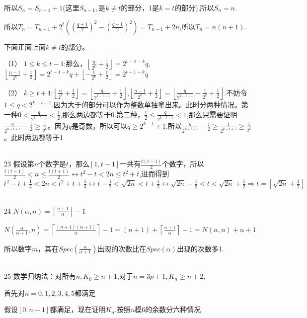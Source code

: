 \documentclass[onecolumn]{article}
\begin{document}
所以$S_{n}=S_{n-1}+1$(这里$S_{n-1},$是$k \ne t$的部分，1是$k=t$的部分),所以$S_{n}=n$. \par
所以$T_{n}=T_{n-1}+2^{t}((\frac{q+1}{2})^{2}-(\frac{q-1}{2})^{2})=T_{n-1}+2n$,所以$T_{n}=n(n+1)$. \par
下面正面上面$k\ne t$的部分。\par
（1） $1 \le k \le t-1$:那么，$\left \lfloor \frac{n}{2^{k}}+\frac{1}{2} \right \rfloor=2^{t-1-k}q$,$\left \lfloor \frac{n-1}{2^{k}}+\frac{1}{2} \right \rfloor=2^{t-1-k}q+\left \lfloor -\frac{1}{2^{k}}+\frac{1}{2} \right \rfloor=2^{t-1-k}q$\par
（2） $k \ge t+1$:$\left \lfloor \frac{n}{2^{k}}+\frac{1}{2} \right \rfloor=\left \lfloor \frac{q}{2^{k-t+1}}+\frac{1}{2} \right \rfloor$,$\left \lfloor \frac{n-1}{2^{k}}+\frac{1}{2} \right \rfloor=\left \lfloor \frac{q}{2^{k-t+1}}-\frac{1}{2^{k}}+\frac{1}{2} \right \rfloor$.不妨令$1\le q<2^{k-t+1}$.因为大于的部分可以作为整数单独拿出来。此时分两种情况。第一种$0 < \frac{q}{2^{k-t+1}} < \frac{1}{2}$,那么两边都等于0.第二种，$\frac{1}{2} \le \frac{q}{2^{k-t+1}} < 1$,那么只需要证明$ \frac{q}{2^{k-t+1}}-\frac{1}{2} \ge \frac{1}{2^{k}}$。因为$q$是奇数，所以可以$q \ge 2^{k-t}+1$.所以$\frac{q}{2^{k-t+1}}-\frac{1}{2} \ge \frac{1}{2^{k-t+1}} \ge \frac{1}{2^{k}} $。此时两边都等于1\par
~\\
23 假设第$n$个数字是$t$，那么$[1,t-1]$一共有$\frac{t(t-1)}{2}$个数字，所以$\frac{t(t-1)}{2}<n\leq \frac{t(t+1)}{2}\leftrightarrow t^{2}-t<2n\leq t^{2}+t$,进而得到$ t^{2}-t+\frac{1}{4}<2n< t^{2}+t+\frac{1}{4}\leftrightarrow t-\frac{1}{2}<\sqrt{2n}<t+\frac{1}{2}\leftrightarrow \sqrt{2n}-\frac{1}{2}<t<\sqrt{2n}+\frac{1}{2}\Rightarrow t=\left \lfloor \sqrt{2n}+\frac{1}{2} \right \rfloor$ \par
~\\
24   $N(\alpha,n)=\left \lceil \frac{n+1}{\alpha} \right \rceil-1$ \par
$N(\frac{\alpha}{\alpha + 1},n)=\left \lceil \frac{(n+1)(\alpha + 1)}{\alpha} \right \rceil-1=(n+1)+\left \lceil \frac{n+1}{\alpha} \right \rceil-1=N(\alpha,n)+n+1$ \par
所以数字$m$，其在$Spec(\frac{\alpha}{\alpha +1})$出现的次数比在$Spec(\alpha)$出现的次数多1. \par
~\\
25 数学归纳法：对所有$n, K_{0} \ge n+1$,对于$n=3p+1,K_{n}\ge n+2, $ \par
首先对$n=0,1,2,3,4,5$都满足 \par
假设$[0,n-1]$都满足，现在证明$K_{n}$.按照$n$模6的余数分六种情况\par
\end{document}
